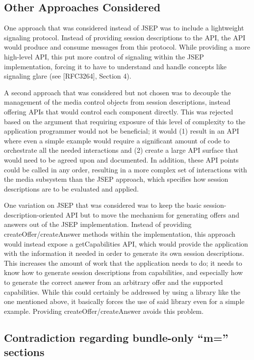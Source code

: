 \documentclass{article}
\begin{document}
\subsection{Other Approaches Considered}

One approach that was considered instead of JSEP was to include a
lightweight signaling protocol.  Instead of providing session
descriptions to the API, the API would produce and consume messages
from this protocol.  While providing a more high-level API, this put
more control of signaling within the JSEP implementation, forcing it
to have to understand and handle concepts like signaling glare (see
[RFC3264], Section 4).

A second approach that was considered but not chosen was to decouple
the management of the media control objects from session
descriptions, instead offering APIs that would control each component
directly.  This was rejected based on the argument that requiring
exposure of this level of complexity to the application programmer
would not be beneficial; it would (1) result in an API where even a
simple example would require a significant amount of code to
orchestrate all the needed interactions and (2) create a large API
surface that would need to be agreed upon and documented.  In
addition, these API points could be called in any order, resulting in
a more complex set of interactions with the media subsystem than the
JSEP approach, which specifies how session descriptions are to be
evaluated and applied.

One variation on JSEP that was considered was to keep the basic
session-description-oriented API but to move the mechanism for
generating offers and answers out of the JSEP implementation.
Instead of providing createOffer/createAnswer methods within the
implementation, this approach would instead expose a getCapabilities
API, which would provide the application with the information it
needed in order to generate its own session descriptions.  This
increases the amount of work that the application needs to do; it
needs to know how to generate session descriptions from capabilities,
and especially how to generate the correct answer from an arbitrary
offer and the supported capabilities.  While this could certainly be
addressed by using a library like the one mentioned above, it
basically forces the use of said library even for a simple example.
Providing createOffer/createAnswer avoids this problem.

\subsection{Contradiction regarding bundle-only ``m='' sections}
\end{document}
